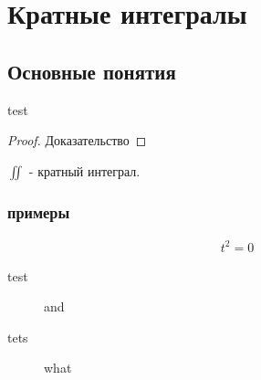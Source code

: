 \chapter{Кратные интегралы}
\section{Основные понятия}

\begin{theorem}
  test
\end{theorem}
\begin{proof}
  Доказательство
\end{proof}
\begin{definition}
  $\iint$ - кратный интеграл.
\end{definition}
\subsection{примеры}
\begin{example}
  \begin{eqnarray}
    \label{eq:tquad}
    t^2 = 0
  \end{eqnarray}
\end{example}

\begin{description}
  \item[test] and
  \item[tets] what
\end{description}

